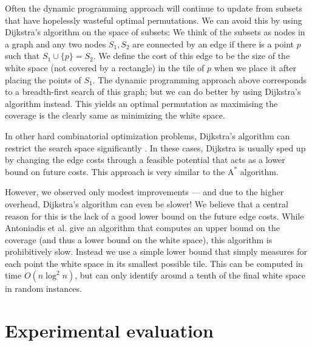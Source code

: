 \documentclass[11pt, a4paper, twocolumn]{article}
\begin{document}
Often the dynamic programming approach will continue to update from subsets that have hopelessly
wasteful optimal permutations. We can avoid this by using Dijkstra's algorithm on the space of
subsets: We think of the subsets as nodes in a graph and any two nodes $S_1, S_2$ are connected
by an edge if there is a point $p$ such that $S_1 \cup \{p\} = S_2$. We define the cost of
this edge to be the size of the white space (not covered by a rectangle) in the tile of $p$ when we
place it after placing the points of $S_1$. The dynamic programming approach above corresponds to
a breadth-first search of this graph; but we can do better by using Dijkstra's algorithm instead.
This yields an optimal permutation as maximising the coverage is the clearly same as minimizing the white space.

In other hard combinatorial optimization problems, Dijkstra's algorithm can restrict the search space
significantly \cite{hougardy2015dijkstra}. In these cases, Dijkstra is usually sped up by 
changing the edge costs through a feasible potential that acts as a lower bound on future costs.
This approach is very similar to the $\text{A}^*$ algorithm.

However, we observed only modest improvements --- and due to the higher overhead, Dijkstra's algorithm
can even be slower! We believe that a central reason for this is the lack
of a good lower bound on the future edge costs. While Antoniadis et al. \cite{antoniadis2019complexity}
give an algorithm that computes an upper bound on the coverage (and thus a lower bound on the white space),
this algorithm is prohibitively slow. Instead we use a simple lower bound that simply measures for each
point the white space in its smallest possible tile. This can be computed in time $O(n \log^2 n)$, but can
only identify around a tenth of the final white space in random instances.

\section{Experimental evaluation}
\label{experiments}
\end{document}
